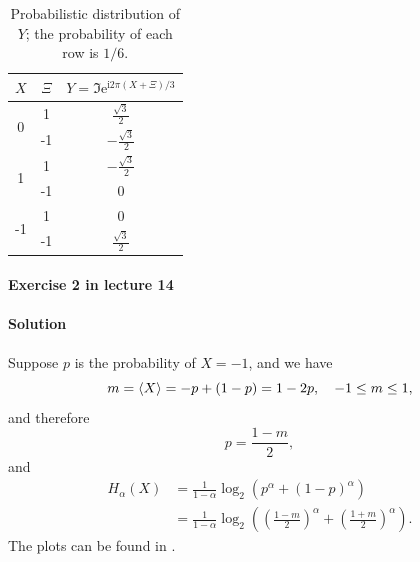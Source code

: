 \documentclass[hyperref, a4paper]{article}
\newcommand*{\ii}{\mathrm{i}}
\newcommand*{\ee}{\mathrm{e}}
\begin{document}
\begin{table}
    \centering
    \caption{Probabilistic distribution of $Y$; the probability of each row is $1/6$.}
    \label{tbl:prob-y}

    \begin{tabular}{ccc}
    \toprule
    $X$                 & $\Xi$ & $Y = \Im \ee^{\ii 2 \pi(X+\Xi) / 3}$ \\ \midrule
    \multirow{2}{*}{0}  & 1     & $\frac{\sqrt{3}}{2}$                 \\
                        & -1    & $-\frac{\sqrt{3}}{2}$                \\ \midrule
    \multirow{2}{*}{1}  & 1     & $-\frac{\sqrt{3}}{2}$                \\
                        & -1    & $0$                                  \\ \midrule
    \multirow{2}{*}{-1} & 1     & $0$                                  \\
                        & -1    & $\frac{\sqrt{3}}{2}$                 \\ \bottomrule 
    \end{tabular}
\end{table}

\paragraph{Exercise 2 in lecture 14}

\paragraph{Solution} Suppose $p$ is the probability of $X = -1$,
and we have 
\begin{equation}
    m = \expval{X} = - p + (1 - p) = 1 - 2p, \quad -1 \leq m \leq 1,
\end{equation}
and therefore 
\begin{equation}
    p = \frac{1 - m}{2}, 
\end{equation}
and 
\begin{equation}
    \begin{aligned}
        H_\alpha(X) &= \frac{1}{1 - \alpha} \log_2(p^{\alpha} + (1 - p)^\alpha) \\
        &= \frac{1}{1 - \alpha} \log_2\left(
            \left( \frac{1 - m}{2} \right)^{\alpha}
            + \left( \frac{1 + m}{2} \right)^{\alpha}
        \right).
    \end{aligned}
\end{equation}
The plots can be found in .
\end{document}
